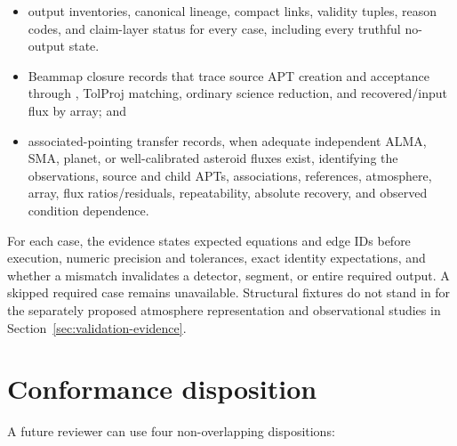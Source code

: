 \documentclass[10pt]{article}
\begin{document}
\begin{itemize}
  response-changing kernel; and
\item output inventories, canonical lineage, compact links, validity tuples,
  reason codes, and claim-layer status for every case, including every
  truthful no-output state.
\item Beammap closure records that trace source APT creation and
   acceptance through , TolProj matching,
  ordinary science reduction, and recovered/input flux by array; and
\item associated-pointing transfer records, when adequate independent ALMA,
  SMA, planet, or well-calibrated asteroid fluxes exist, identifying the
  observations, source and child APTs, associations, references, atmosphere,
  array, flux ratios/residuals, repeatability, absolute recovery, and observed
  condition dependence.
\end{itemize}

For each case, the evidence states expected equations and edge IDs before
execution, numeric precision and tolerances, exact identity expectations, and
whether a mismatch invalidates a detector, segment, or entire required output.
A skipped required case remains unavailable. Structural fixtures do not stand
in for the separately proposed atmosphere representation and observational
studies in Section~\ref{sec:validation-evidence}.

\clearpage
\section{Conformance disposition}
\label{sec:eng-disposition}

A future reviewer can use four non-overlapping dispositions:
\end{document}
